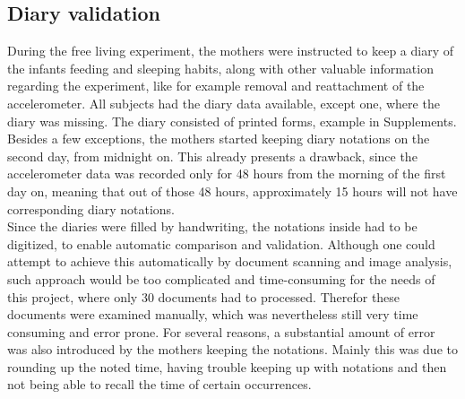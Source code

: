 \documentclass{article}
\begin{document}
{%

\subsection{Diary validation}

During the free living experiment, the mothers were instructed to keep a diary of the infants feeding and sleeping habits, along with other valuable information regarding the experiment, like for example removal and reattachment of the accelerometer. All subjects had the diary data available, except one, where the diary was missing. The diary consisted of printed forms, example in Supplements. Besides a few exceptions, the mothers started keeping diary notations on the second day, from midnight on. This already presents a drawback, since the accelerometer data was recorded only for 48 hours from the morning of the first day on, meaning that out of those 48 hours, approximately 15 hours will not have corresponding diary notations. \\Since the diaries were filled by handwriting, the notations inside had to be digitized, to enable automatic comparison and validation. Although one could attempt to achieve this automatically by document scanning and image analysis, such approach would be too complicated and time-consuming for the needs of this project, where only 30 documents had to processed. Therefor these documents were examined manually, which was nevertheless still very time consuming and error prone. For several reasons, a substantial amount of error was also introduced by the mothers keeping the notations. Mainly this was due to rounding up the noted time, having trouble keeping up with notations and then not being able to recall the time of certain occurrences.\\
}
\end{document}
